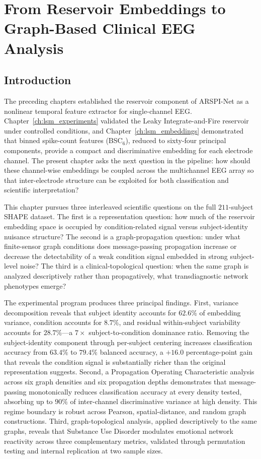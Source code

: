 
\chapter{From Reservoir Embeddings to Graph-Based Clinical EEG Analysis}
\label{chap:arspi_net}

\section{Introduction}
\label{sec:ch5_intro}

The preceding chapters established the reservoir component of ARSPI-Net as a nonlinear temporal feature extractor for single-channel EEG. Chapter~\ref{ch:lsm_experiments} validated the Leaky Integrate-and-Fire reservoir under controlled conditions, and Chapter~\ref{ch:lsm_embeddings} demonstrated that binned spike-count features (BSC$_6$), reduced to sixty-four principal components, provide a compact and discriminative embedding for each electrode channel. The present chapter asks the next question in the pipeline: how should these channel-wise embeddings be coupled across the multichannel EEG array so that inter-electrode structure can be exploited for both classification and scientific interpretation?

This chapter pursues three interleaved scientific questions on the full $211$-subject SHAPE dataset. The first is a representation question: how much of the reservoir embedding space is occupied by condition-related signal versus subject-identity nuisance structure? The second is a graph-propagation question: under what finite-sensor graph conditions does message-passing propagation increase or decrease the detectability of a weak condition signal embedded in strong subject-level noise? The third is a clinical-topological question: when the same graph is analyzed descriptively rather than propagatively, what transdiagnostic network phenotypes emerge?

The experimental program produces three principal findings. First, variance decomposition reveals that subject identity accounts for $62.6\%$ of embedding variance, condition accounts for $8.7\%$, and residual within-subject variability accounts for $28.7\%$---a $7\times$ subject-to-condition dominance ratio. Removing the subject-identity component through per-subject centering increases classification accuracy from $63.4\%$ to $79.4\%$ balanced accuracy, a $+16.0$ percentage-point gain that reveals the condition signal is substantially richer than the original representation suggests. Second, a Propagation Operating Characteristic analysis across six graph densities and six propagation depths demonstrates that message-passing monotonically reduces classification accuracy at every density tested, absorbing up to $90\%$ of inter-channel discriminative variance at high density. This regime boundary is robust across Pearson, spatial-distance, and random graph constructions. Third, graph-topological analysis, applied descriptively to the same graphs, reveals that Substance Use Disorder modulates emotional network reactivity across three complementary metrics, validated through permutation testing and internal replication at two sample sizes.

